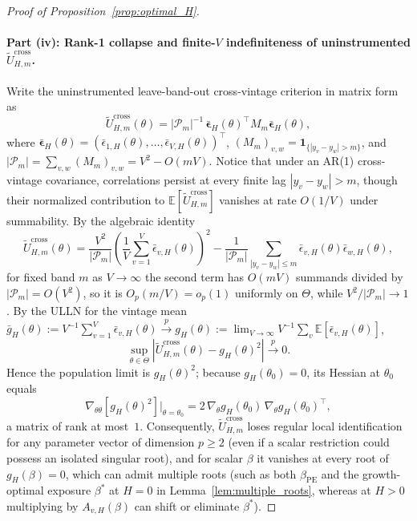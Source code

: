 \begin{proof}[Proof of Proposition~\ref{prop:optimal_H}]
\paragraph{Part (iv): Rank-1 collapse and finite-$V$ indefiniteness of uninstrumented $\widetilde{U}_{H,m}^{\mathrm{cross}}$.}
Write the uninstrumented leave-band-out cross-vintage criterion in matrix form as
\[
\widetilde{U}_{H,m}^{\mathrm{cross}}(\theta)
= |\mathcal{P}_m|^{-1}\,\boldsymbol{\bar\epsilon}_H(\theta)^\top M_m \boldsymbol{\bar\epsilon}_H(\theta),
\]
where $\boldsymbol{\bar\epsilon}_H(\theta) = (\bar\epsilon_{1,H}(\theta),\dots,\bar\epsilon_{V,H}(\theta))^\top$, $(M_m)_{v,w} = \mathbf{1}_{\{|y_v - y_w| > m\}}$, and $|\mathcal{P}_m| = \sum_{v,w}(M_m)_{v,w} = V^2 - O(mV)$.
Notice that under an AR(1) cross-vintage covariance, correlations persist at every finite lag $|y_v - y_w| > m$, though their normalized contribution to $\mathbb{E}[\widetilde{U}_{H,m}^{\mathrm{cross}}]$ vanishes at rate $O(1/V)$ under summability. By the algebraic identity
\[
\widetilde{U}_{H,m}^{\mathrm{cross}}(\theta)
= \frac{V^2}{|\mathcal{P}_m|}\left(\frac{1}{V}\sum_{v=1}^V \bar\epsilon_{v,H}(\theta)\right)^2
- \frac{1}{|\mathcal{P}_m|}\sum_{|y_v-y_w|\le m}\bar\epsilon_{v,H}(\theta)\bar\epsilon_{w,H}(\theta),
\]
for fixed band $m$ as $V \to \infty$ the second term has $O(mV)$ summands divided by $|\mathcal{P}_m| = O(V^2)$, so it is $O_p(m/V) = o_p(1)$ uniformly on $\Theta$, while $V^2/|\mathcal{P}_m| \to 1$.
By the ULLN for the vintage mean $\bar{g}_H(\theta) := V^{-1}\sum_{v=1}^V \bar\epsilon_{v,H}(\theta) \xrightarrow{p} g_H(\theta) := \lim_{V\to\infty} V^{-1}\sum_v \mathbb{E}[\bar\epsilon_{v,H}(\theta)]$,
\[
\sup_{\theta \in \Theta}\left|\widetilde{U}_{H,m}^{\mathrm{cross}}(\theta) - g_H(\theta)^2\right| \xrightarrow{p} 0.
\]
Hence the population limit is $g_H(\theta)^2$; because $g_H(\theta_0) = 0$, its Hessian at $\theta_0$ equals
\[
\nabla_{\theta\theta}\!\left[g_H(\theta)^2\right]\Big|_{\theta=\theta_0}
= 2\,\nabla_\theta g_H(\theta_0)\,\nabla_\theta g_H(\theta_0)^\top,
\]
a matrix of rank at most~$1$.
Consequently, $\widetilde{U}_{H,m}^{\mathrm{cross}}$ loses regular local identification for any parameter vector of dimension $p \ge 2$ (even if a scalar restriction could possess an isolated singular root), and for scalar $\beta$ it vanishes at every root of $g_H(\beta) = 0$, which can admit multiple roots (such as both $\beta_{\mathrm{PE}}$ and the growth-optimal exposure $\beta^\ast$ at $H = 0$ in Lemma~\ref{lem:multiple_roots}, whereas at $H > 0$ multiplying by $A_{v,H}(\beta)$ can shift or eliminate $\beta^\ast$).

\end{proof}
